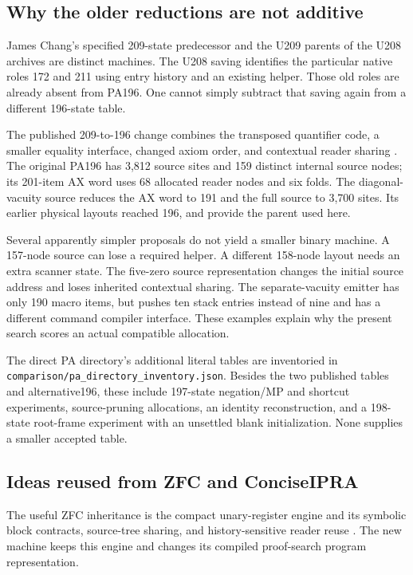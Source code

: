 \documentclass[11pt,letterpaper]{article}
\newcommand{\file}[1]{\texttt{\nolinkurl{#1}}}
\begin{document}
\subsection{Why the older reductions are not additive}
James Chang's specified 209-state predecessor and the U209 parents of the
U208 archives are distinct machines. The U208 saving identifies the
particular native roles 172 and 211 using entry history and an existing
helper. Those old roles are already absent from PA196. One cannot simply
subtract that saving again from a different 196-state table.

The published 209-to-196 change combines the transposed quantifier code,
a smaller equality interface, changed axiom order, and contextual reader
sharing \cite{chang}. The original PA196 has 3,812 source sites and 159
distinct internal source nodes; its 201-item AX word uses 68 allocated
reader nodes and six folds. The diagonal-vacuity source reduces the AX
word to 191 and the full source to 3,700 sites. Its earlier physical
layouts reached 196, and provide the parent used here.

Several apparently simpler proposals do not yield a smaller binary
machine. A 157-node source can lose a required helper. A different
158-node layout needs an extra scanner state. The five-zero source
representation changes the initial source address and loses inherited
contextual sharing. The separate-vacuity emitter has only 190 macro
items, but pushes ten stack entries instead of nine and has a different
command compiler interface. These examples explain why the present
search scores an actual compatible allocation.

The direct PA directory's additional literal tables are inventoried in
\file{comparison/pa_directory_inventory.json}. Besides the two
published tables and alternative196, these include 197-state
negation/MP and shortcut experiments, source-pruning allocations, an
identity reconstruction, and a 198-state root-frame experiment with an
unsettled blank initialization. None supplies a smaller accepted table.

\subsection{Ideas reused from ZFC and ConciseIPRA}
The useful ZFC inheritance is the compact unary-register engine and its
symbolic block contracts, source-tree sharing, and history-sensitive
reader reuse \cite{zfc}. The new machine keeps this engine and changes
its compiled proof-search program representation.
\end{document}
